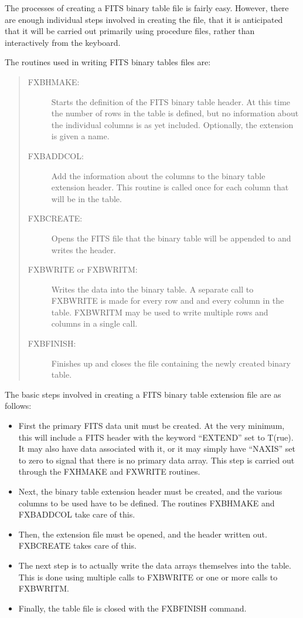 The processes of creating a FITS binary table file is fairly easy.  However,
there are enough individual steps involved in creating the file, that it is
anticipated that it will be carried out primarily using procedure files, rather
than interactively from the keyboard.

The routines used in writing FITS binary tables files are:
\begin{quote}
\begin{description}
\item[FXBHMAKE:]
Starts the definition of the FITS binary table header.  At this time the number
of rows in the table is defined, but no information about the individual
columns is as yet included.  Optionally, the extension is given a name.
\item[FXBADDCOL:]
Add the information about the columns to the binary table extension header.
This routine is called once for each column that will be in the table.
\item[FXBCREATE:]
Opens the FITS file that the binary table will be appended to and writes the
header.
\item[FXBWRITE or FXBWRITM:]
Writes the data into the binary table.  A separate call to FXBWRITE is
made for every row and and every column in the table.  FXBWRITM may be
used to write multiple rows and columns in a single call.
\item[FXBFINISH:]
Finishes up and closes the file containing the newly created binary table.
\end{description}
\end{quote}

The basic steps involved in creating a FITS binary table extension file are as
follows:
%
\begin{itemize}
\item
	First the primary FITS data unit must be created.  At the very minimum,
	this will include a FITS header with the keyword ``EXTEND'' set to
	T(rue).  It may also have data associated with it, or it may simply
	have ``NAXIS'' set to zero to signal that there is no primary data
	array.  This step is carried out through the FXHMAKE and FXWRITE
	routines.
\item
	Next, the binary table extension header must be created, and the
	various columns to be used have to be defined.  The routines FXBHMAKE
	and FXBADDCOL take care of this.
\item
	Then, the extension file must be opened, and the header written out.
	FXBCREATE takes care of this.
\item
	The next step is to actually write the data arrays themselves into the
	table.  This is done using multiple calls to FXBWRITE or one or more
	calls to FXBWRITM.
\item
	Finally, the table file is closed with the FXBFINISH command.
\end{itemize}

